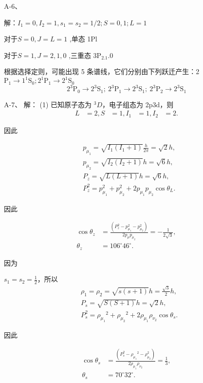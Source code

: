 \documentclass{article}
\begin{document}
\begin{CJK*}{UTF8}{gbsn}
A-6、

解：$I_1= 0, I_2= 1, s_1= s_2= 1/ 2; S= 0, 1; L= 1$

对于$S=0,J=L=1$ ,单态 1Pl

对于$S=1,J=2,1,0$ ,三重态 3P$_2.1.0$

根据选择定则，可能出现 5 条谱线，它们分别由下列跃迁产生：2$\mathrm{P}_1\to1^1\mathrm{S}_0;2^1\mathrm{P}_1\to2^1\mathrm{S}_0$
$$2^3\mathrm{P}_0\to2^3\mathrm{S}_1;\:2^3\mathrm{P}_1\to2^3\mathrm{S}_1;\:2^3\mathrm{P}_2\to2^3\mathrm{S}_1$$

A-7、
解：
(1) 
已知原子态为 $^3D$，电子组态为 2p3d，则
\begin{align*}
L &= 2, S &= 1, I_1 &= 1, I_2 &= 2.
\end{align*}

因此

\begin{align*}
&p_{\mu_{1}}=\sqrt{I_{1}(I_{1}+1)}\frac{h}{2\pi}=\sqrt{2}h, \\
&p_{\mu_{2}}=\sqrt{I_{2}(I_{2}+1)}h=\sqrt{6}h, \\
&P_{z}=\sqrt{L(L+1)}h=\sqrt{6}h, \\
&P_{z}^{2}=p_{\mu_{1}}^{2}+p_{\mu_{2}}^{2}+2p_{\mu_{1}}p_{\mu_{2}}\cos\theta_{L}.
\end{align*}

因此

\begin{align*}
\cos\theta_{z}&=\frac{(P_{z}^{2}-p_{\mu_{1}}^{2}-p_{\mu_{2}}^{2})}{2p_{\mu}p_{\mu_{2}}}=-\frac{1}{2\sqrt{3}}, \\
\theta_{z}&=106^{\circ}46^{\circ}.
\end{align*}

因为

$s_{1}=s_{2}=\frac{1}{2}$，所以
\begin{align*}
&\rho_{1}=\rho_{2}=\sqrt{s(s+1)}h=\frac{\sqrt{3}}{2}h, \\
&P_{s}=\sqrt{S(S+1)}h=\sqrt{2}h, \\
&P_{s}^{2}={\rho_{\mu_{1}}}^{2}+{\rho_{\mu_{2}}}^{2}+2{\rho_{\mu_{1}}\rho_{\nu_{2}}}\cos\theta_{s}.
\end{align*}

因此

\begin{align*}
\cos\theta_{s}&=\frac{(P_{s}^{2}-{\rho_{\mu_{1}}}^{2}-\rho_{\mu_{2}}^{2})}{2{\rho_{\mu_{1}}\rho_{\nu_{2}}}}=\frac{1}{3}, \\
\theta_{s}&=70^{\circ}32^{\circ}.
\end{align*}


\end{CJK*}
\end{document}
